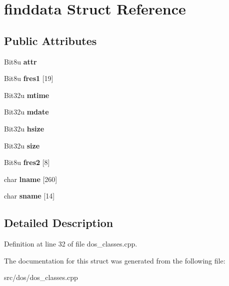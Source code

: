 \hypertarget{structfinddata}{\section{finddata Struct Reference}
\label{structfinddata}
}
\subsection*{Public Attributes}
\begin{DoxyCompactItemize}
\item 
\hypertarget{structfinddata_ac31eee27e5186901e535b47168d11fca}{Bit8u {\bfseries attr}}\label{structfinddata_ac31eee27e5186901e535b47168d11fca}

\item 
\hypertarget{structfinddata_a1474fc754ffe3e01368d5a0d6f02cb73}{Bit8u {\bfseries fres1} \mbox{[}19\mbox{]}}\label{structfinddata_a1474fc754ffe3e01368d5a0d6f02cb73}

\item 
\hypertarget{structfinddata_a274810be19b37e41187749addc313148}{Bit32u {\bfseries mtime}}\label{structfinddata_a274810be19b37e41187749addc313148}

\item 
\hypertarget{structfinddata_af4752e2b4ec3e8815426b64945c0e601}{Bit32u {\bfseries mdate}}\label{structfinddata_af4752e2b4ec3e8815426b64945c0e601}

\item 
\hypertarget{structfinddata_ae42f17cb73ef9fd19418ae02f9a1f182}{Bit32u {\bfseries hsize}}\label{structfinddata_ae42f17cb73ef9fd19418ae02f9a1f182}

\item 
\hypertarget{structfinddata_a82ac5d8ab1ed9b02b2ee559bdef2cd64}{Bit32u {\bfseries size}}\label{structfinddata_a82ac5d8ab1ed9b02b2ee559bdef2cd64}

\item 
\hypertarget{structfinddata_a08fbc8249076bf9a4d8d1d867e40c3c0}{Bit8u {\bfseries fres2} \mbox{[}8\mbox{]}}\label{structfinddata_a08fbc8249076bf9a4d8d1d867e40c3c0}

\item 
\hypertarget{structfinddata_a65703ad906334cc0e88f120f84dfc623}{char {\bfseries lname} \mbox{[}260\mbox{]}}\label{structfinddata_a65703ad906334cc0e88f120f84dfc623}

\item 
\hypertarget{structfinddata_ab8e002bb9d937d20bf3e6de099ef3fdf}{char {\bfseries sname} \mbox{[}14\mbox{]}}\label{structfinddata_ab8e002bb9d937d20bf3e6de099ef3fdf}

\end{DoxyCompactItemize}


\subsection{Detailed Description}


Definition at line 32 of file dos\-\_\-classes.\-cpp.



The documentation for this struct was generated from the following file\-:\begin{DoxyCompactItemize}
\item 
src/dos/dos\-\_\-classes.\-cpp\end{DoxyCompactItemize}
